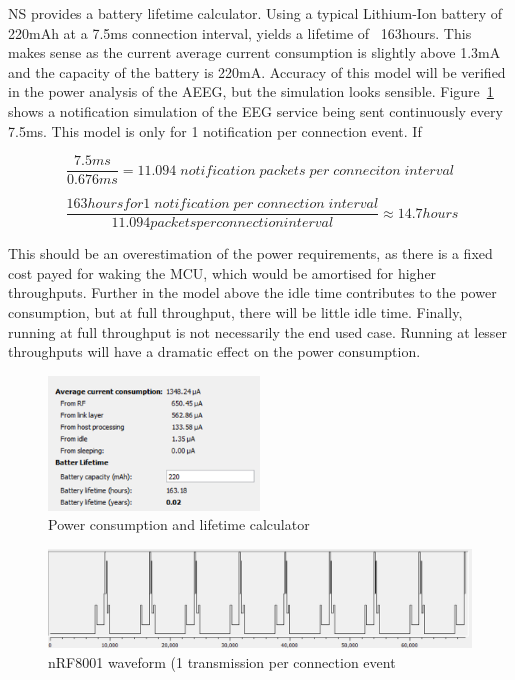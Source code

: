 \documentclass[]{article}
\begin{document}
\ac{NS} provides a battery lifetime calculator. Using a typical Lithium-Ion battery of 220mAh at a 7.5ms connection interval, yields a lifetime of ~163hours. This makes sense as the current average current consumption is slightly above 1.3mA and the capacity of the battery is 220mA. Accuracy of this model will be verified in the power analysis of the \ac{AEEG}, but the simulation looks sensible. Figure~\ref{fig:nrfsim} shows a notification simulation of the EEG service being sent continuously every 7.5ms. This model is only for 1 notification per connection event. If 

\begin{displaymath}
\frac{7.5ms}{0.676ms} = 11.094\; notification\; packets\; per\; conneciton\; interval
\end{displaymath}

\begin{displaymath}
\;
\frac{163 hours for 1 \;notification\; per\; connection\; interval}{11.094 packets per connection interval} \approx 14.7 hours
\end{displaymath}


This should be an overestimation of the power requirements, as there is a fixed cost payed for waking the MCU, which would be amortised for higher throughputs. Further in the model above the idle time contributes to the power consumption, but at full throughput, there will be little idle time. Finally, running at full throughput is not necessarily the end used case. Running at lesser throughputs will have a dramatic effect on the power consumption.
 

\begin{figure}[htb]
	\begin{center}
		\includegraphics[width = 0.5\textwidth]{nrfsim}
	\end{center}
	\caption{Power consumption and lifetime calculator}
	\label{fig:nrfsim}
\end{figure}

\begin{figure}[htb]
	\begin{center}
		\includegraphics[width = 1.1\textwidth]{nrfwave}
	\end{center}
	\caption{nRF8001 waveform (1 transmission per connection event}
	\label{fig:nrfwave}
\end{figure}
\end{document}
